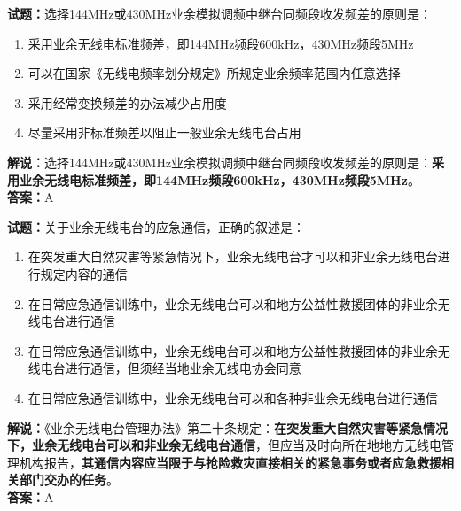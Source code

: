 \documentclass{ctexbook}
\begin{document}
\vspace{1em}

\textbf{试题：}选择144\unit{\MHz}或430\unit{\MHz}业余模拟调频中继台同频段收发频差的原则是：
\begin{enumerate}[leftmargin=3em]
  \item 采用业余无线电标准频差，即144\unit{\MHz}频段600\unit{\kHz}，430\unit{\MHz}频段5\unit{\MHz}
  \item 可以在国家《无线电频率划分规定》所规定业余频率范围内任意选择
  \item 采用经常变换频差的办法减少占用度
  \item 尽量采用非标准频差以阻止一般业余无线电台占用
\end{enumerate}
\noindent\textbf{解说：}选择144\unit{\MHz}或430\unit{\MHz}业余模拟调频中继台同频段收发频差的原则是：\textbf{采用业余无线电标准频差，即144\unit{\MHz}频段600\unit{\kHz}，430\unit{\MHz}频段5\unit{\MHz}}。\\\noindent\textbf{答案：}A

\vspace{1em}

\textbf{试题：}关于业余无线电台的应急通信，正确的叙述是：
\begin{enumerate}[leftmargin=3em]
  \item 在突发重大自然灾害等紧急情况下，业余无线电台才可以和非业余无线电台进行规定内容的通信
  \item 在日常应急通信训练中，业余无线电台可以和地方公益性救援团体的非业余无线电台进行通信
  \item 在日常应急通信训练中，业余无线电台可以和地方公益性救援团体的非业余无线电台进行通信，但须经当地业余无线电协会同意
  \item 在日常应急通信训练中，业余无线电台可以和各种非业余无线电台进行通信
\end{enumerate}
\noindent\textbf{解说：}《业余无线电台管理办法》第二十条规定：\textbf{在突发重大自然灾害等紧急情况下，业余无线电台可以和非业余无线电台通信}，但应当及时向所在地地方无线电管理机构报告，\textbf{其通信内容应当限于与抢险救灾直接相关的紧急事务或者应急救援相关部门交办的任务}。\\\noindent\textbf{答案：}A

\vspace{1em}
\end{document}
